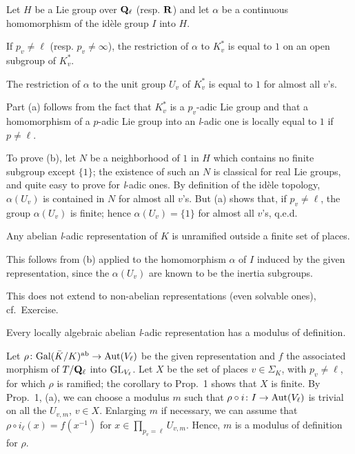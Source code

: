 \begin{proposition}
Let $H$ be a Lie group over $\mathbf{Q}_\ell$ (resp. $\mathbf{R}$) and let $\alpha$ be a
continuous homomorphism of the idèle group $I$ into $H$.
\begin{alist}
\item If $p_v\neq\ell$ (resp. $p_v\neq\infty$), the restriction of
$\alpha$ to $K_v^*$ is equal to $1$ on an open subgroup of $K_v^*$.
\item The restriction of $\alpha$ to the unit group $U_v$ of $K_v^*$ is
equal to $1$ for almost all $v$'s.
\end{alist}
\end{proposition}

Part (a) follows from the fact that $K_v^*$ is a $p_v$-adic Lie group and
that a homomorphism of a $p$-adic Lie group into an \textit{l}-adic one
is locally equal to $1$ if $p\neq\ell$.

To prove (b), let $N$ be a neighborhood of $1$ in $H$ which contains no
finite subgroup except $\{1\}$; the existence of such an $N$ is classical
for real Lie groups, and quite easy to prove for \textit{l}-adic ones.
By definition of the idèle topology, $\alpha(U_v)$ is contained in $N$
for almost all $v$'s.  But (a) shows that, if $p_v\neq\ell$, the group
$\alpha(U_v)$ is finite; hence $\alpha(U_v)=\{1\}$ for almost all $v$'s,
q.e.d.

\begin{corollary}
Any abelian \textit{l}-adic representation of $K$ is unramified outside a
finite set of places.
\end{corollary}

This follows from (b) applied to the homomorphism $\alpha$ of $I$ induced
by the given representation, since the $\alpha(U_v)$ are known to be the
inertia subgroups.


This does not extend to non-abelian representations (even solvable ones),
cf.~Exercise.

\begin{proposition}[2]\label{prop:III.2.2.2}
Every locally algebraic abelian \textit{l}-adic representation has a
modulus of definition.
\end{proposition}

Let $\rho\colon\mathrm{Gal}(\bar K/K)^{\mathrm{ab}}\to\mathrm{Aut}(V_\ell)$ be the given
representation and $f$ the associated morphism of $T/\mathbf{Q}_\ell$ into
$\mathrm{GL}_{V_\ell}$.  Let $X$ be the set of places $v\in\Sigma_K$, with
$p_v\neq\ell$, for which $\rho$ is ramified; the corollary to Prop.~1
shows that $X$ is finite.  By Prop.~1, (a), we can choose a modulus $m$
such that $\rho\circ i\colon I\to\mathrm{Aut}(V_\ell)$ is trivial on all the
$U_{v,m}$, $v\in X$.  Enlarging $m$ if necessary, we can assume that
$\rho\circ i_\ell(x)=f(x^{-1})$ for $x\in\prod_{p_v=\ell}U_{v,m}$.  Hence,
$m$ is a modulus of definition for $\rho$.

